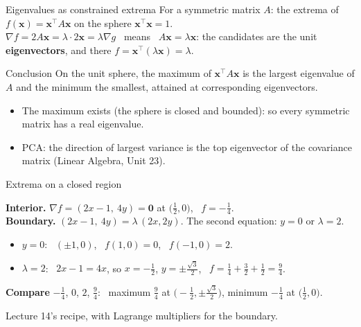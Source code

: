 \documentclass[10pt]{wosm-slides}
\newcommand{\vx}{\mathbf{x}}
\begin{document}
\begin{frame}{Eigenvalues as constrained extrema}
  For a symmetric matrix $A$: the extrema of $f(\vx) = \vx^\top A\vx$ on the sphere $\vx^\top\vx = 1$.
  \pause\\[0.4em]
  $\nabla f = 2A\vx = \lambda \cdot 2\vx = \lambda\nabla g$ \ means \ $A\vx = \lambda\vx$: the candidates
  are the unit \textbf{eigenvectors}, and there $f = \vx^\top(\lambda\vx) = \lambda$.
  \pause
  \begin{block}{Conclusion}
    On the unit sphere, the maximum of $\vx^\top A\vx$ is the largest eigenvalue of $A$ and the
    minimum the smallest, attained at corresponding eigenvectors.
  \end{block}
  \pause
  \begin{itemize}
    \item The maximum exists (the sphere is closed and bounded): so every symmetric matrix has a
      real eigenvalue.
    \item PCA: the direction of largest variance is the top eigenvector of the covariance
      matrix (Linear Algebra, Unit 23).
  \end{itemize}
\end{frame}

\begin{frame}{Extrema on a closed region}
  \begin{example}[$f = x^2 + 2y^2 - x$ on the disc $x^2 + y^2 \le 1$]
    \textbf{Interior.} $\nabla f = (2x - 1, \ 4y) = \mathbf 0$ at $\bigl(\frac12, 0\bigr)$, \ $f = -\frac14$.
    \pause\\[0.3em]
    \textbf{Boundary.} $(2x - 1, \ 4y) = \lambda\,(2x, 2y)$. The second equation: $y = 0$ or $\lambda = 2$.
    \begin{itemize}
      \item $y = 0$: \ $(\pm 1, 0)$, \ $f(1, 0) = 0$, \ $f(-1, 0) = 2$.
      \item $\lambda = 2$: \ $2x - 1 = 4x$, so $x = -\frac12$, $y = \pm\frac{\sqrt3}{2}$, \
        $f = \frac14 + \frac32 + \frac12 = \frac94$.
    \end{itemize}
    \pause
    \textbf{Compare} $-\frac14$, $0$, $2$, $\frac94$: \ maximum $\frac94$ at
    $\bigl(-\frac12, \pm\frac{\sqrt3}2\bigr)$, minimum $-\frac14$ at $\bigl(\frac12, 0\bigr)$.
  \end{example}
  {\small Lecture 14's recipe, with Lagrange multipliers for the boundary.\par}
\end{frame}
\end{document}
